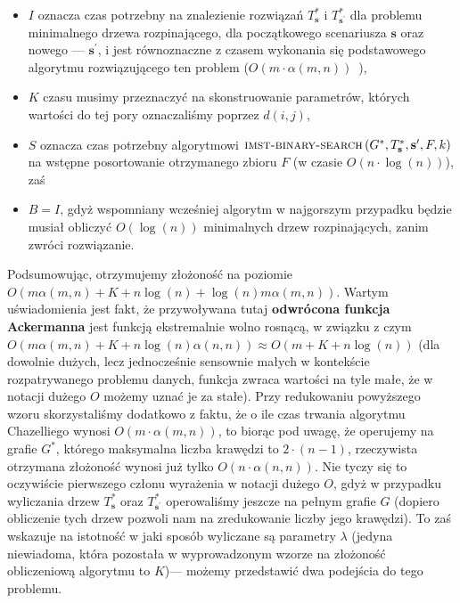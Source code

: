 \begin{itemize}
	\item $I$ oznacza czas potrzebny na znalezienie rozwiązań $T^{\ast}_{\textbf{s}}$ i $T^{\ast}_{\textbf{s}^{\prime}}$ dla problemu minimalnego drzewa rozpinającego, dla początkowego scenariusza $\textbf{s}$ oraz nowego --- $\textbf{s}^{\prime}$, i jest równoznaczne z czasem wykonania się podstawowego algorytmu rozwiązującego ten problem ($O \left( m \cdot \alpha \left( m, n \right) \right)$~\cite{Chazelle:2000:MST:355541.355562}),
	\item $K$ czasu musimy przeznaczyć na skonstruowanie parametrów, których wartości do tej pory oznaczaliśmy poprzez $d \left( i, j \right)$,
	\item $S$ oznacza czas potrzebny algorytmowi $\textsc{imst-binary-search} \left( G^{\ast}, T^{\ast}_{\textbf{s}}, \textbf{s}^{\prime}, F, k \right)$ na wstępne posortowanie otrzymanego zbioru $F$ (w czasie $O \left( n \cdot \log \left( n \right) \right)$), zaś
	\item $B = I$, gdyż wspomniany wcześniej algorytm w najgorszym przypadku będzie musiał obliczyć $O \left( \log \left( n \right) \right)$ minimalnych drzew rozpinających, zanim zwróci rozwiązanie.
\end{itemize}

Podsumowując, otrzymujemy złożoność na poziomie $O \left( m \alpha \left( m, n \right) + K + n \log \left( n \right) + \log \left( n \right) m \alpha \left( m, n \right) \right)$. Wartym uświadomienia jest fakt, że przywoływana tutaj \textbf{odwrócona funkcja Ackermanna} jest funkcją ekstremalnie wolno rosnącą, w związku z czym $O \left( m \alpha \left( m, n \right) + K + n \log \left( n \right) \alpha \left( n, n \right) \right) \approx O \left( m + K + n \log \left( n \right) \right)$ (dla dowolnie dużych, lecz jednocześnie sensownie małych w kontekście rozpatrywanego problemu danych, funkcja zwraca wartości na tyle małe, że w notacji dużego $O$ możemy uznać je za stałe). Przy redukowaniu powyższego wzoru skorzystaliśmy dodatkowo z faktu, że o ile czas trwania algorytmu Chazelliego wynosi $O \left( m \cdot \alpha \left( m, n \right) \right)$, to biorąc pod uwagę, że operujemy na grafie $G^{\ast}$, którego maksymalna liczba krawędzi to $2 \cdot \left( n - 1 \right)$, rzeczywista otrzymana złożoność wynosi już tylko $O \left( n \cdot \alpha \left( n, n \right) \right)$. Nie tyczy się to oczywiście pierwszego członu wyrażenia w notacji dużego $O$, gdyż w przypadku wyliczania drzew $T^{\ast}_{\textbf{s}}$ oraz $T^{\ast}_{\textbf{s}^{\prime}}$ operowaliśmy jeszcze na pełnym grafie $G$ (dopiero obliczenie tych drzew pozwoli nam na zredukowanie liczby jego krawędzi). To zaś wskazuje na istotność w jaki sposób wyliczane są parametry $\lambda$ (jedyna niewiadoma, która pozostała w wyprowadzonym wzorze na złożoność obliczeniową algorytmu to $K$)--- możemy przedstawić dwa podejścia do tego problemu.

